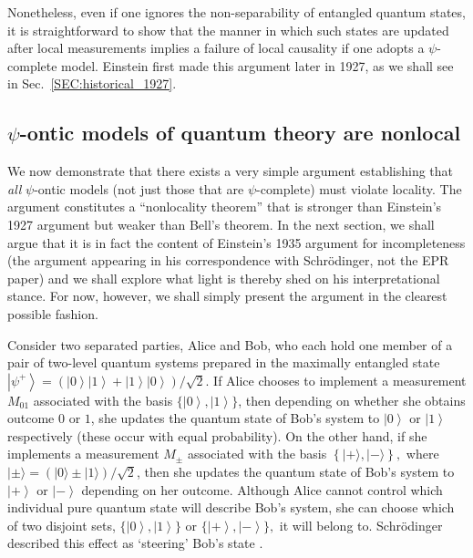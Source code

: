 \documentclass[aps,nofootinbib,12pt]{revtex4-2}
\begin{document}
Nonetheless, even if one ignores the non-separability of entangled
quantum states, it is straightforward to show that the manner in
which such states are updated after local measurements implies a
failure of local causality if one adopts a $\psi$-complete model.
Einstein first made this argument later in 1927, as we shall see in
Sec.~\ref{SEC:historical_1927}.

\subsection{$\psi$-ontic models of quantum theory are \textbf{nonlocal}
\label{SEC:locality_theorem}}

We now demonstrate that there exists a very simple argument
establishing that \emph{all} $\psi$-ontic models (not just those
that are $\psi$-complete) must violate locality. The argument
constitutes a ``nonlocality theorem'' that is stronger than
Einstein's 1927 argument but weaker than Bell's theorem. In the next
section, we shall argue that it is in fact the content of Einstein's
1935 argument for incompleteness (the argument appearing in his
correspondence with Schr\"{o}dinger, not the EPR paper) and we shall
explore what light is thereby shed on his interpretational stance.
For now, however, we shall simply present the argument in the
clearest possible fashion.

Consider two separated parties, Alice and Bob, who each hold one
member of a pair of two-level quantum systems prepared in the
maximally entangled state $\left\vert \psi^{+}\right\rangle =\left(
\left\vert 0\right\rangle \left\vert 1\right\rangle +\left\vert
1\right\rangle \left\vert 0\right\rangle \right)/\sqrt{2}$. If Alice
chooses to implement a measurement $M_{01}$ associated with the
basis $\{\left\vert 0\right\rangle ,\left\vert 1\right\rangle \}$,
then depending on whether she obtains outcome $0$ or $1$, she
updates the quantum state of Bob's system to $\left\vert
0\right\rangle $ or $\left\vert 1\right\rangle $ respectively (these
occur with equal probability). On the other hand, if she implements
a measurement $M_{\pm}$ associated with the basis $\left\{
|+\rangle,|-\rangle\right\},$ where $|\pm\rangle = (|0\rangle \pm
|1\rangle)/\sqrt{2}$, then she updates the quantum state of Bob's
system to $\left\vert +\right\rangle $ or $\left\vert -\right\rangle
$ depending on her outcome. Although Alice cannot control which
individual pure quantum state will describe Bob's system, she can
choose which of two disjoint sets, $\{\left\vert 0\right\rangle
,\left\vert 1\right\rangle \}$ or $\{\left\vert +\right\rangle
,\left\vert -\right\rangle \},$ it will belong to. Schr\"{o}dinger
described this effect as `steering' Bob's state
\cite{schroed_steer}.
\end{document}
